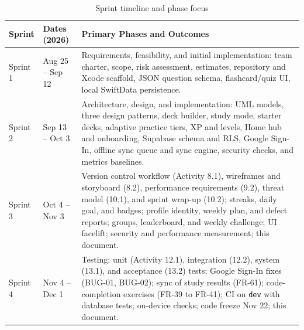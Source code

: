 \documentclass[12pt,letterpaper]{article}
\begin{document}
\begin{table}[H]
\centering
\caption{Sprint timeline and phase focus}
\label{tab:timeline}
\begin{tabularx}{\textwidth}{@{}l L{3.6cm} Y@{}}
\toprule
\textbf{Sprint} & \textbf{Dates (2026)} & \textbf{Primary Phases and Outcomes} \\
\midrule
Sprint 1 & Aug 25 -- Sep 12 & Requirements, feasibility, and initial implementation: team charter, scope, risk assessment, estimates, repository and Xcode scaffold, JSON question schema, flashcard/quiz UI, local SwiftData persistence. \\
Sprint 2 & Sep 13 -- Oct 3 & Architecture, design, and implementation: UML models, three design patterns, deck builder, study mode, starter decks, adaptive practice tiers, XP and levels, Home hub and onboarding, Supabase schema and RLS, Google Sign-In, offline sync queue and sync engine, security checks, and metrics baselines. \\
Sprint 3 & Oct 4 -- Nov 3 & Version control workflow (Activity 8.1), wireframes and storyboard (8.2), performance requirements (9.2), threat model (10.1), and sprint wrap-up (10.2); streaks, daily goal, and badges; profile identity, weekly plan, and defect reports; groups, leaderboard, and weekly challenge; UI facelift; security and performance measurement; this document. \\
Sprint 4 & Nov 4 -- Dec 1 & Testing: unit (Activity 12.1), integration (12.2), system (13.1), and acceptance (13.2) tests; Google Sign-In fixes (BUG-01, BUG-02); sync of study results (FR-61); code-completion exercises (FR-39 to FR-41); CI on \texttt{dev} with database tests; on-device checks; code freeze Nov 22; this document. \\
\bottomrule
\end{tabularx}
\end{table}
\end{document}
